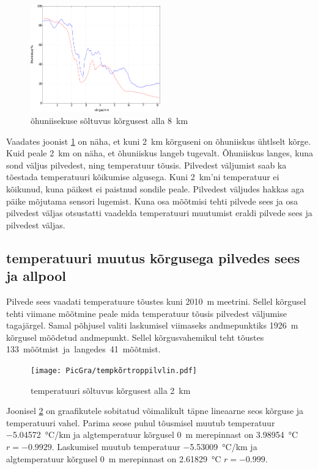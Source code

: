 \documentclass{trkut}%
\begin{document}
\begin{figure}[h]
	\includegraphics[width=0.5\textwidth]{PicGra/humkõrtrop.pdf}
	\caption{õhuniisekuse sõltuvus kõrgusest alla \SI{8}{km}}
	\label{humkõrtrop}%
\end{figure}

Vaadates joonist \ref{humkõrtrop} on näha, et kuni \SI{2}{km} kõrguseni on õhuniiskus ühtlselt kõrge. Kuid peale \SI{2}{km} on näha, et õhuniiskus langeb tugevalt. Õhuniiskus langes, kuna sond väljus pilvedest, ning temperatuur tõusis. Pilvedest väljumist saab ka tõestada temperatuuri kõikumise algusega. Kuni \SI{2}{km}'ni temperatuur ei kõikunud, kuna päikest ei paistnud sondile peale. Pilvedest väljudes hakkas aga päike mõjutama sensori lugemist. Kuna osa mõõtmisi tehti pilvede sees ja osa pilvedest väljas otsustatti vaadelda temperatuuri muutumist eraldi pilvede sees ja pilvedest väljas.

\subsection{temperatuuri muutus kõrgusega pilvedes sees ja allpool}
Pilvede sees vaadati temperatuure tõustes kuni  \SI{2010}{m} meetrini. Sellel kõrgusel tehti viimane mõõtmine peale mida temperatuur tõusis pilvedest väljumise tagajärgel. Samal põhjusel valiti laskumisel viimaseks andmepunktiks \SI{1926}{m} kõrgusel mõõdetud andmepunkt. Sellel kõrgusvahemikul teht tõustes \SI{133} mõõtmist ja langedes \SI{41} mõõtmist.

\begin{figure}[h]
	\texttt{[image: PicGra/tempkõrtroppilvlin.pdf]}
	\caption{temperatuuri sõltuvus kõrgusest alla \SI{2}{km}}
	\label{tempkõrtroppilvlin}%
\end{figure}

Joonisel \ref{tempkõrtroppilvlin} on graafikutele sobitatud võimalikult täpne lineaarne seos kõrguse ja temperatuuri vahel. Parima seose puhul tõusmisel muutub temperatuur \SI{-5.04572}{\degreeCelsius/km} ja algtemperatuur kõrgusel \SI{0}{m} merepinnast on \SI{3.98954}{\celsius} $r=-0.9929$. Laskumisel muutub temperatuur \SI{-5.53009}{\degreeCelsius/km} ja algtemperatuur kõrgusel \SI{0}{m} merepinnast on \SI{2.61829}{\celsius} $r=-0.999$.
\end{document}
